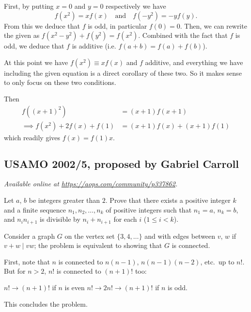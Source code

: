 \documentclass[11pt]{scrartcl}
\begin{document}
First, by putting $x=0$ and $y=0$ respectively
we have \[ f(x^2) = xf(x) \quad\text{and}\quad f(-y^2) = -yf(y). \]
From this we deduce that $f$ is odd, in particular $f(0) = 0$.
Then, we can rewrite the given as $f(x^2-y^2) + f(y^2) = f(x^2)$.
Combined with the fact that $f$ is odd, we deduce that $f$ is additive
(i.e. $f(a+b)=f(a)+f(b)$).

\begin{remark*}
  [Philosophy]
  At this point we have $f(x^2) \equiv xf(x)$ and $f$ additive,
  and everything we have including the given equation
  is a direct corollary of these two.
  So it makes sense to only focus on these two conditions.
\end{remark*}

Then
\begin{align*}
  f( (x+1)^2 ) &= (x+1)f(x+1) \\
  \implies f(x^2) + 2f(x) + f(1)
  &= (x+1)f(x) + (x+1)f(1)
\end{align*}
which readily gives $f(x) = f(1)x$.
\pagebreak

\subsection{USAMO 2002/5, proposed by Gabriel Carroll}
\textsl{Available online at \url{https://aops.com/community/p337862}.}
\begin{mdframed}[style=mdpurplebox,frametitle={Problem statement}]
Let $a$, $b$ be integers greater than $2$.
Prove that there exists a positive integer $k$
and a finite sequence $n_1, n_2, \dots, n_k$ of
positive integers such that $n_1 = a$, $n_k = b$,
and $n_i n_{i+1}$ is divisible by $n_i + n_{i+1}$
for each $i$ ($1 \leq i < k$).
\end{mdframed}
Consider a graph $G$ on the vertex set $\{3, 4, \dots\}$
and with edges between $v$, $w$ if $v + w \mid vw$;
the problem is equivalent to showing that $G$ is connected.

First, note that $n$ is connected to $n(n-1)$, $n(n-1)(n-2)$, etc.\
up to $n!$.
But for $n > 2$, $n!$ is connected to $(n+1)!$ too:
\begin{itemize}
  \ii $n! \to (n+1)!$ if $n$ is even
  \ii $n! \to 2n! \to (n+1)!$ if $n$ is odd.
\end{itemize}
This concludes the problem.
\pagebreak
\end{document}
